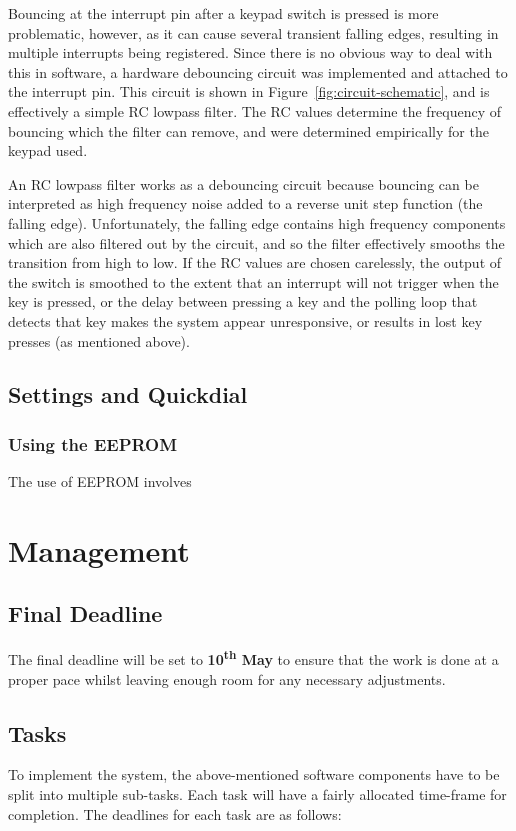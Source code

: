 \documentclass[11pt,a4paper,twocolumn]{scrartcl}
\begin{document}
Bouncing at the interrupt pin after a keypad switch is pressed is more problematic, however, as it can cause several transient falling edges, resulting in multiple interrupts being registered. Since there is no obvious way to deal with this in software, a hardware debouncing circuit was implemented and attached to the interrupt pin. This circuit is shown in Figure~\ref{fig:circuit-schematic}, and is effectively a simple RC lowpass filter. The RC values determine the frequency of bouncing which the filter can remove, and were determined empirically for the keypad used.

An RC lowpass filter works as a debouncing circuit because bouncing can be interpreted as high frequency noise added to a reverse unit step function (the falling edge). Unfortunately, the falling edge contains high frequency components which are also filtered out by the circuit, and so the filter effectively smooths the transition from high to low. If the RC values are chosen carelessly, the output of the switch is smoothed to the extent that an interrupt will not trigger when the key is pressed, or the delay between pressing a key and the polling loop that detects that key makes the system appear unresponsive, or results in lost key presses (as mentioned above).

\subsection{Settings and Quickdial} \label{settings-quickdial}

\subsubsection{Using the EEPROM}

The use of EEPROM involves 

\section{Management} \label{schedule}
\subsection{Final Deadline}
The final deadline will be set to \textbf{10\textsuperscript{th} May} to ensure that the work is done at a proper pace whilst leaving enough room for any necessary 
adjustments.

\subsection{Tasks}
To implement the system, the above-mentioned software components have to be split into multiple sub-tasks. Each task will have a fairly allocated time-frame for completion. The deadlines for each task are as follows:
\end{document}
